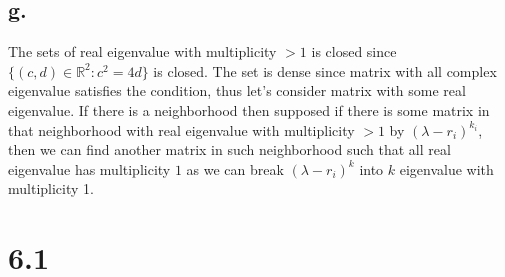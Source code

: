 \documentclass[11pt]{article}
\theoremstyle{mystyle}
\theoremstyle{definition}
\begin{document}
\subsection*{g.}
The sets of real eigenvalue with multiplicity $>1$ is closed since $\{(c,d) \in \mathbb{R}^2: c^2 = 4d\}$ is closed. The set is dense since matrix with all complex eigenvalue satisfies the condition, thus let's consider matrix with some real eigenvalue. If there is a neighborhood then supposed if there is some matrix in that neighborhood with real eigenvalue with multiplicity $> 1$ by $(\lambda-r_i)^{k_i}$, then we can find another matrix in such neighborhood such that all real eigenvalue has multiplicity $1$ as we can break $(\lambda-r_i)^k$ into $k$ eigenvalue with multiplicity 1. 
\clearpage
\section*{6.1}
\end{document}
